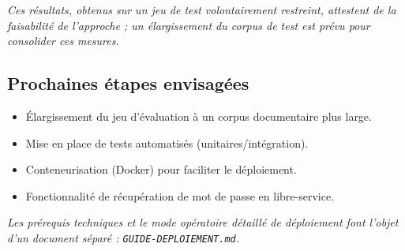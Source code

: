 \documentclass[12pt,a4paper]{article}
\begin{document}
\textit{Ces résultats, obtenus sur un jeu de test volontairement restreint, attestent de la faisabilité de l'approche ; un élargissement du corpus de test est prévu pour consolider ces mesures.}

\subsection{Prochaines étapes envisagées}
\begin{itemize}
  \item Élargissement du jeu d'évaluation à un corpus documentaire plus large.
  \item Mise en place de tests automatisés (unitaires/intégration).
  \item Conteneurisation (Docker) pour faciliter le déploiement.
  \item Fonctionnalité de récupération de mot de passe en libre-service.
\end{itemize}

\vspace{0.5cm}


\vspace{0.5cm}
\noindent\textit{Les prérequis techniques et le mode opératoire détaillé de déploiement font l'objet d'un document séparé : \texttt{GUIDE-DEPLOIEMENT.md}.}
\end{document}

